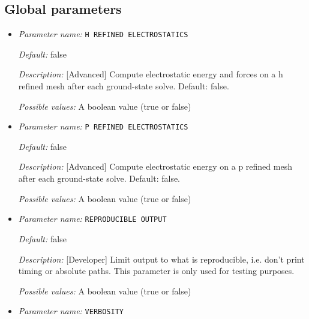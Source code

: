 \subsection{Global parameters}
\label{parameters:global}


\begin{itemize}
\item {\it Parameter name:} {\tt H REFINED ELECTROSTATICS}
\label{parameters:H REFINED ELECTROSTATICS}
\label{parameters:H_20REFINED_20ELECTROSTATICS}




{\it Default:} false


{\it Description:} [Advanced] Compute electrostatic energy and forces on a h refined mesh after each ground-state solve. Default: false.


{\it Possible values:} A boolean value (true or false)
\item {\it Parameter name:} {\tt P REFINED ELECTROSTATICS}
\label{parameters:P REFINED ELECTROSTATICS}
\label{parameters:P_20REFINED_20ELECTROSTATICS}




{\it Default:} false


{\it Description:} [Advanced] Compute electrostatic energy on a p refined mesh after each ground-state solve. Default: false.


{\it Possible values:} A boolean value (true or false)
\item {\it Parameter name:} {\tt REPRODUCIBLE OUTPUT}
\label{parameters:REPRODUCIBLE OUTPUT}
\label{parameters:REPRODUCIBLE_20OUTPUT}




{\it Default:} false


{\it Description:} [Developer] Limit output to what is reproducible, i.e. don't print timing or absolute paths. This parameter is only used for testing purposes.


{\it Possible values:} A boolean value (true or false)
\item {\it Parameter name:} {\tt VERBOSITY}
\label{parameters:VERBOSITY}





\end{itemize}
